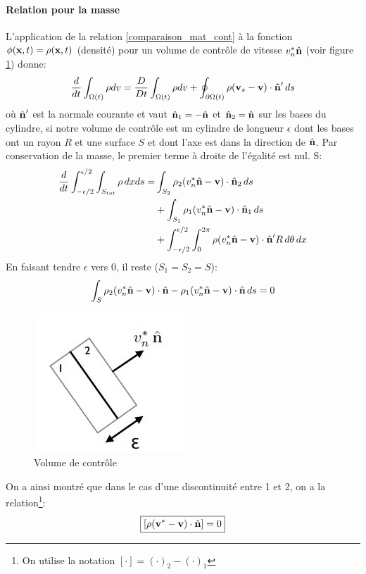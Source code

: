 \paragraph{Relation pour la masse}
L'application de la relation \ref{comparaison_mat_cont} à la fonction $\phi(\textbf{x},t)=\rho(\textbf{x},t)$ (densité) pour un volume de contrôle de vitesse $v^*_n\hat{\textbf{n}}$ (voir figure \ref{fig:disc_vol_cont}) donne:
$$\frac{d}{dt}\int_{\Omega (t)}\rho dv=\frac{D}{Dt}\int_{\Omega (t)}\rho dv+\oint_{\partial \Omega (t)}\rho(\textbf{v}_s-\textbf{v})\cdot \textbf{\^n}'\,ds$$
où $\hat{\textbf{n}}'$ est la normale courante et vaut $\hat{\textbf{n}}_1=-\hat{\textbf{n}}$ et $\hat{\textbf{n}}_2=\hat{\textbf{n}}$ sur les bases du cylindre, si notre volume de contrôle est un cylindre de longueur $\epsilon$ dont les bases ont un rayon $R$ et une surface $S$ et dont l'axe est dans la direction de $\hat{\textbf{n}}$.
Par conservation de la masse, le premier terme à droite de l'égalité est nul. S:
\begin{align*}
\frac{d}{dt}\int_{-\epsilon/2}^{\epsilon/2}\int_{S_{tot}} \rho\,dxds=&\int_{S_2}\rho_2(v_n^*\hat{\textbf{n}}-\textbf{v})\cdot\hat{\textbf{n}}_2\,ds\\
 &+\int_{S_1}\rho_1(v_n^*\hat{\textbf{n}}-\textbf{v})\cdot\hat{\textbf{n}}_1\,ds\\
 &+\int_{-\epsilon/2}^{\epsilon/2}\int_0^{2\pi}\rho(v_n^*\hat{\textbf{n}}-\textbf{v})\cdot\hat{\textbf{n}}'R\,d\theta \,dx
\end{align*}
En faisant tendre $\epsilon$ vers 0, il reste ($S_1=S_2=S$):
$$\int_{S}\rho_2(v_n^*\hat{\textbf{n}}-\textbf{v})\cdot\hat{\textbf{n}}-\rho_1(v_n^*\hat{\textbf{n}}-\textbf{v})\cdot\hat{\textbf{n}}\,ds=0$$
\begin{figure}[!h]
\centering
\includegraphics[scale=0.6]{./discontinuite_vol_controle.jpg}
\caption{Volume de contrôle}
\label{fig:disc_vol_cont}
\end{figure}
On a ainsi montré que dans le cas d'une discontinuité entre 1 et 2, on a la relation\footnote{On utilise la notation $[\cdot]=(\cdot)_2-(\cdot)_1$}:
$$\boxed{[\rho(\textbf{v}^*-\textbf{v})\cdot\hat{\textbf{n}}]=0}$$
